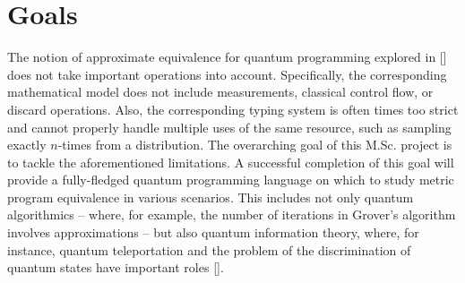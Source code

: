 \section{Goals}
The notion of approximate equivalence for quantum programming explored in [\cite{dahlqvist2022syntactic}] does not take important operations into account. Specifically, the corresponding mathematical model does not include measurements, classical control flow, or discard operations. Also, the corresponding typing system is often times too strict and cannot properly handle multiple uses of the same resource, such as sampling exactly $n$-times from a distribution. The overarching goal of this M.Sc. project is to tackle the aforementioned limitations. A successful completion of this goal will provide a fully-fledged quantum programming language on which to study metric program equivalence in various scenarios. This includes not only quantum algorithmics – where, for example, the number of iterations in Grover’s algorithm involves approximations – but also quantum information theory, where, for instance, quantum teleportation and the problem
of the discrimination of quantum states have important roles [\cite{nielsen2010quantum}].